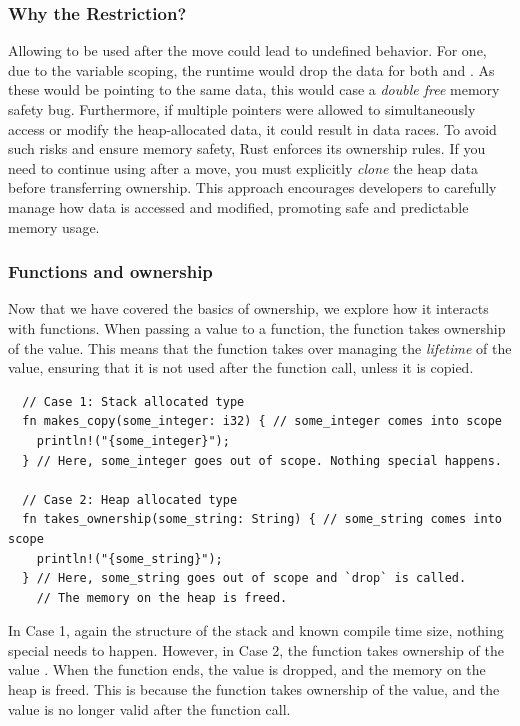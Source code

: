 \documentclass[twoside,11pt]{report}
\theoremstyle{definition}
\theoremstyle{plain}
\begin{document}
\subsubsection*{Why the Restriction?}

Allowing  to be used after the move could lead to undefined behavior. For one, due to the variable scoping, the runtime would drop the data for both  and . As these would be pointing to the same data, this would case a \textit{double free} memory safety bug. Furthermore, if multiple pointers were allowed to simultaneously access or modify the heap-allocated data, it could result in data races. To avoid such risks and ensure memory safety, Rust enforces its ownership rules. If you need to continue using  after a move, you must explicitly \textit{clone} the heap data before transferring ownership. This approach encourages developers to carefully manage how data is accessed and modified, promoting safe and predictable memory usage.

\subsubsection{Functions and ownership}\label{sec:rustlifetimes} %
Now that we have covered the basics of ownership, we explore how it interacts with functions. When passing a value to a function, the function takes ownership of the value. This means that the function takes over managing the \textit{lifetime} of the value, ensuring that it is not used after the function call, unless it is copied.
\begin{verbatim}
  // Case 1: Stack allocated type
  fn makes_copy(some_integer: i32) { // some_integer comes into scope
    println!("{some_integer}");
  } // Here, some_integer goes out of scope. Nothing special happens.

  // Case 2: Heap allocated type
  fn takes_ownership(some_string: String) { // some_string comes into scope
    println!("{some_string}");
  } // Here, some_string goes out of scope and `drop` is called.
    // The memory on the heap is freed.
\end{verbatim}

In Case 1, again the structure of the stack and known compile time size, nothing special needs to happen. However, in Case 2, the function  takes ownership of the  value . When the function ends, the  value is dropped, and the memory on the heap is freed. This is because the function takes ownership of the value, and the value is no longer valid after the function call.
\end{document}
